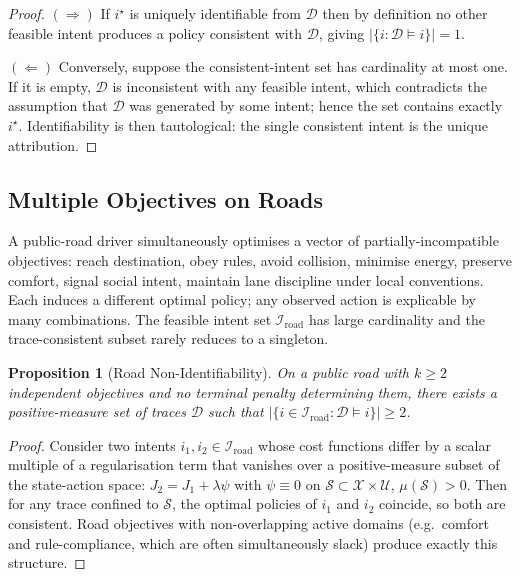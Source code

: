 \documentclass[11pt,twocolumn]{article}
\newtheorem{proposition}[theorem]{Proposition}
\theoremstyle{definition}
\theoremstyle{remark}
\providecommand{\cI}{\mathcal{I}}
\providecommand{\cS}{\mathcal{S}}
\providecommand{\cU}{\mathcal{U}}
\providecommand{\cX}{\mathcal{X}}
\begin{document}
\begin{proof}
$(\Rightarrow)$ If $i^{\star}$ is uniquely identifiable from $\mathcal{D}$ then by definition no other feasible intent produces a policy consistent with $\mathcal{D}$, giving $|\{i : \mathcal{D} \models i\}| = 1$.

$(\Leftarrow)$ Conversely, suppose the consistent-intent set has cardinality at most one. If it is empty, $\mathcal{D}$ is inconsistent with any feasible intent, which contradicts the assumption that $\mathcal{D}$ was generated by some intent; hence the set contains exactly $i^{\star}$. Identifiability is then tautological: the single consistent intent is the unique attribution.
\end{proof}

\subsection{Multiple Objectives on Roads}

A public-road driver simultaneously optimises a vector of partially-incompatible objectives: reach destination, obey rules, avoid collision, minimise energy, preserve comfort, signal social intent, maintain lane discipline under local conventions. Each induces a different optimal policy; any observed action is explicable by many combinations. The feasible intent set $\cI_{\mathrm{road}}$ has large cardinality and the trace-consistent subset rarely reduces to a singleton.

\begin{proposition}[Road Non-Identifiability]\label{prop:road-noid}
On a public road with $k \ge 2$ independent objectives and no terminal penalty determining them, there exists a positive-measure set of traces $\mathcal{D}$ such that $|\{i \in \cI_{\mathrm{road}} : \mathcal{D} \models i\}| \ge 2$.
\end{proposition}

\begin{proof}
Consider two intents $i_1, i_2 \in \cI_{\mathrm{road}}$ whose cost functions differ by a scalar multiple of a regularisation term that vanishes over a positive-measure subset of the state-action space: $J_2 = J_1 + \lambda \psi$ with $\psi \equiv 0$ on $\cS \subset \cX \times \cU$, $\mu(\cS) > 0$. Then for any trace confined to $\cS$, the optimal policies of $i_1$ and $i_2$ coincide, so both are consistent. Road objectives with non-overlapping active domains (e.g.\ comfort and rule-compliance, which are often simultaneously slack) produce exactly this structure.
\end{proof}
\end{document}
